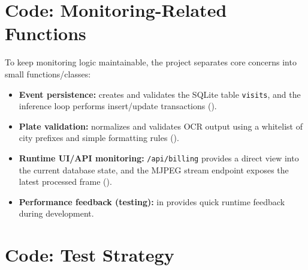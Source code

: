 \section{Code: Monitoring-Related Functions}

\noindent
To keep monitoring logic maintainable, the project separates core concerns into small functions/classes:
\begin{itemize}
	\item \textbf{Event persistence:}  creates and validates the SQLite table \texttt{visits},
	and the inference loop performs insert/update transactions
	().
	
	\item \textbf{Plate validation:}  normalizes and validates OCR output
	using a whitelist of city prefixes and simple formatting rules
	().
	
	\item \textbf{Runtime UI/API monitoring:} \texttt{/api/billing} provides a direct view into the current database state,
	and the MJPEG stream endpoint exposes the latest processed frame
	().
	
	\item \textbf{Performance feedback (testing):}  in
	provides quick runtime feedback during development.
\end{itemize}

\section{Code: Test Strategy}

